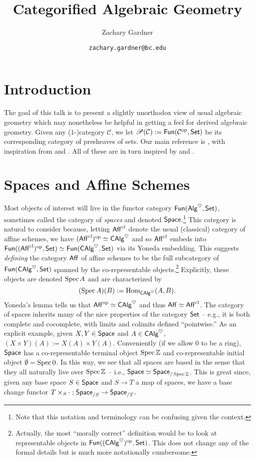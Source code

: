 \documentclass[11pt]{article}
\renewcommand{\C}{\mathcal{C}}
\begin{document}
\title{Categorified Algebraic Geometry}
\author{Zachary Gardner}
\date{\texttt{zachary.gardner@bc.edu}}
\maketitle

\thispagestyle{fancydate}

\section{Introduction}
The goal of this talk is to present a slightly unorthodox view of usual algebraic geometry which may nonetheless be helpful in getting a feel for derived algebraic geometry. Given any ($1$-)category $\C$, we let $\Pre(\C):=\Fun(\C^{\op},\Set)$ be its corresponding category of presheaves of sets. Our main reference is \cite{Ras18}, with inspiration from \cite{Toe} and \cite{Str00}. All of these are in turn inspired by \cite{DG70} and \cite{LM00}.

\section{Spaces and Affine Schemes}
Most objects of interest will live in the functor category $\operatorname{\mathsf{Fun}}(\operatorname{\mathsf{Alg}}^{\heartsuit},\operatorname{\mathsf{Set}})$, sometimes called the category of \emph{spaces} and denoted $\operatorname{\mathsf{Space}}$.\footnote{Note that this notation and terminology can be confusing given the context.} This category is natural to consider because, letting $\operatorname{\mathsf{Aff}}^{\operatorname{cl}}$ denote the usual (classical) category of affine schemes, we have $(\operatorname{\mathsf{Aff}}^{\operatorname{cl}})^{\operatorname{op}}\simeq\operatorname{\mathsf{CAlg}}^{\heartsuit}$ and so $\operatorname{\mathsf{Aff}}^{\operatorname{cl}}$ embeds into $\operatorname{\mathsf{Fun}}((\operatorname{\mathsf{Aff}}^{\operatorname{cl}})^{\operatorname{op}},\operatorname{\mathsf{Set}})\simeq\operatorname{\mathsf{Fun}}(\operatorname{\mathsf{CAlg}}^{\heartsuit},\operatorname{\mathsf{Set}})$ via its Yoneda embedding. This suggests \emph{defining} the category $\operatorname{\mathsf{Aff}}$ of affine schemes to be the full subcategory of $\operatorname{\mathsf{Fun}}(\operatorname{\mathsf{CAlg}}^{\heartsuit},\operatorname{\mathsf{Set}})$ spanned by the co-representable objects.\footnote{Actually, the most ``morally correct'' definition would be to look at representable objects in $\operatorname{\mathsf{Fun}}((\operatorname{\mathsf{CAlg}}^{\heartsuit})^{\operatorname{op}},\operatorname{\mathsf{Set}})$. This does not change any of the formal details but is much more notationally cumbersome.} Explicitly, these objects are denoted $\operatorname{Spec} A$ and are characterized by 
$$(\operatorname{Spec} A)(B):=\operatorname{Hom}_{\operatorname{\mathsf{CAlg}}^{\heartsuit}}(A,B).$$
Yoneda's lemma tells us that $\operatorname{\mathsf{Aff}}^{\operatorname{op}}\simeq\operatorname{\mathsf{CAlg}}^{\heartsuit}$ and thus $\operatorname{\mathsf{Aff}}\simeq\operatorname{\mathsf{Aff}}^{\operatorname{cl}}$. The category of spaces inherits many of the nice properties of the category $\operatorname{\mathsf{Set}}$ -- e.g., it is both complete and cocomplete, with limits and colimits defined ``pointwise.'' As an explicit example, given $X,Y\in\operatorname{\mathsf{Space}}$ and $A\in\operatorname{\mathsf{CAlg}}^{\heartsuit}$, $(X\times Y)(A):=X(A)\times Y(A)$. Conveniently (if we allow $0$ to be a ring), $\operatorname{\mathsf{Space}}$ has a co-representable terminal object $\operatorname{Spec}\mathbb{Z}$ and co-representable initial object $\emptyset=\operatorname{Spec}0$. In this way, we see that all spaces are based in the sense that they all naturally live over $\operatorname{Spec}\mathbb{Z}$ -- i.e., $\operatorname{\mathsf{Space}}\simeq\operatorname{\mathsf{Space}}_{/\operatorname{Spec}\mathbb{Z}}$. This is great since, given any base space $S\in\operatorname{\mathsf{Space}}$ and $S\to T$ a map of spaces, we have a base change functor $T\times_S\cdot: \operatorname{\mathsf{Space}}_{/S}\to\operatorname{\mathsf{Space}}_{/T}$. 
\end{document}
